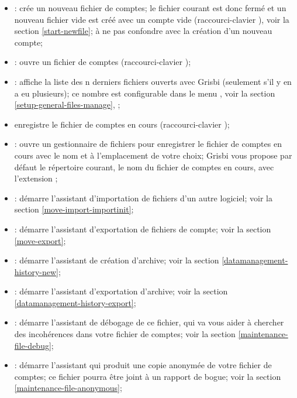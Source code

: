 \begin{itemize}
	\item {}: crée un nouveau fichier de comptes; le fichier courant est donc fermé et un nouveau fichier vide est créé avec un compte vide (raccourci-clavier ), voir la section \vref{start-newfile}; à ne pas confondre avec la création d'un nouveau compte;
	\item {}: ouvre un fichier de comptes (raccourci-clavier );
	\item {}: affiche la liste des n derniers fichiers ouverts avec Grisbi (seulement s'il y en a eu plusieurs); ce nombre est configurable dans le menu , voir la section \vref{setup-general-files-manage}, ;
	\item {} enregistre le fichier de comptes en cours (raccourci-clavier );
	\item {}: ouvre un gestionnaire de fichiers pour enregistrer le fichier de comptes en cours avec le nom et à l'emplacement de 	votre choix; Grisbi vous propose par défaut le répertoire courant, le nom du fichier de comptes en cours, avec l'extension ;
	\item {}: démarre l'assistant d'importation de fichiers d'un autre logiciel; voir la section \vref{move-import-importinit};
	\item {}: démarre l'assistant d'exportation de fichiers de compte; voir la section \vref{move-export};	
	\item {}: démarre l'assistant de création d'archive; voir la section \vref{datamanagement-history-new};	
	\item {}: démarre l'assistant d'exportation d'archive; voir la section \vref{datamanagement-history-export};
	\item {}: démarre l'assistant de 	débogage de ce fichier, qui va vous aider à chercher des incohérences dans votre fichier de comptes; voir la section \vref{maintenance-file-debug};
	\item {}: démarre l'assistant qui produit une copie anonymée de votre fichier de comptes; ce fichier pourra être joint à un rapport de bogue; voir la section \vref{maintenance-file-anonymous};	

\end{itemize}
